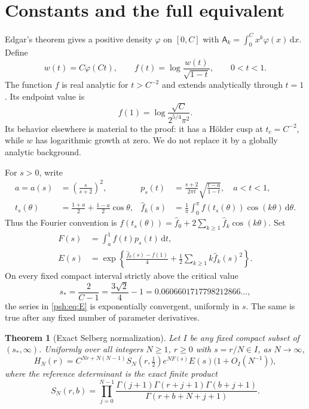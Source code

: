 \documentclass[11pt,a4paper]{article}
\numberwithin{equation}{section}
\newtheorem{theorem}{Theorem}[section]
\theoremstyle{remark}\newtheorem{remark}[theorem]{Remark}
\newcommand{\A}{\mathsf A}
\newcommand{\dd}{\,\mathrm d}
\newcommand{\fh}{\widehat f}
\begin{document}
\section{Constants and the full equivalent}\label{psh:sec:main}
Edgar's theorem \cite{edgar} gives a positive density $\varphi$ on $[0,C]$
with $\A_k=\int_0^C x^k\varphi(x)\dd x$. Define
\begin{equation}\label{psh:eq:wf}
 w(t)=C\varphi(Ct),\qquad
 f(t)=\log\frac{w(t)}{\sqrt{1-t}},\qquad 0<t<1.
\end{equation}
The function $f$ is real analytic for $t>C^{-2}$ and extends analytically
through $t=1$. Its endpoint value is
\begin{equation}\label{psh:eq:f1}
 f(1)=\log\frac{\sqrt C}{2^{5/4}\pi^2}.
\end{equation}
Its behavior elsewhere is material to the proof: it has a H\"older cusp
at $t_c=C^{-2}$, while $w$ has logarithmic growth at zero. We do not
replace it by a globally analytic background.

For $s>0$, write
\begin{align}
 a=a(s)&=\left(\frac{s}{s+2}\right)^2,
 &p_s(t)&=\frac{s+2}{2\pi t}\sqrt{\frac{t-a}{1-t}},\quad a<t<1,
 \label{psh:eq:eqmeasure}\\
 t_s(\theta)&=\frac{1+a}{2}+\frac{1-a}{2}\cos\theta,
 &\fh_k(s)&=\frac1\pi\int_0^\pi f(t_s(\theta))\cos(k\theta)\dd\theta.
 \label{psh:eq:fourier}
\end{align}
Thus the Fourier convention is
$f(t_s(\theta))=\fh_0+2\sum_{k\geq1}\fh_k\cos(k\theta)$.
Set
\begin{align}
 F(s)&=\int_a^1 f(t)p_s(t)\dd t,\label{psh:eq:F}\\
 E(s)&=\exp\left\{\frac{\fh_0(s)-f(1)}4+
                  \frac12\sum_{k\geq1}k\fh_k(s)^2\right\}.
 \label{psh:eq:E}
\end{align}
On every fixed compact interval strictly above the critical value
\begin{equation}\label{psh:eq:critical}
 s_*=\frac{2}{C-1}=\frac{3\sqrt2}{4}-1
       =0.0606601717798212866\ldots,
\end{equation}
the series in \eqref{psh:eq:E} is exponentially convergent, uniformly in $s$.
The same is true after any fixed number of parameter derivatives.

\begin{theorem}[Exact Selberg normalization]\label{psh:thm:selberg}
Let $I$ be any fixed compact subset of $(s_*,\infty)$. Uniformly over all
integers $N\geq1$, $r\geq0$ with $s=r/N\in I$, as $N\to\infty$,
\begin{equation}\label{psh:eq:mainS}
 H_N(r)=C^{Nr+N(N-1)} S_N(r,\tfrac12)
             e^{NF(s)}E(s)\bigl(1+O_I(N^{-1})\bigr),
\end{equation}
where the reference determinant is the exact finite product
\begin{equation}\label{psh:eq:selberg}
 S_N(r,b)=\prod_{j=0}^{N-1}
 \frac{\Gamma(j+1)\Gamma(r+j+1)\Gamma(b+j+1)}
      {\Gamma(r+b+N+j+1)}.
\end{equation}
\end{theorem}
\end{document}
